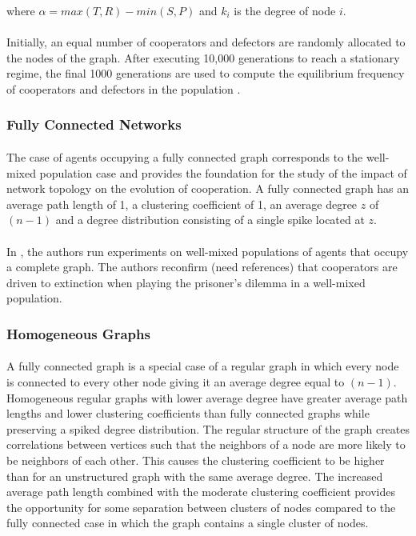 \documentclass{article}
\begin{document}
    where $\alpha=max(T,R)-min(S,P)$ and $k_i$ is the degree of node $i$.

    \paragraph{}Initially, an equal number of cooperators and defectors are randomly allocated to the nodes of the graph.  After executing 10,000 generations to reach a stationary regime, the final 1000 generations are used to compute the equilibrium frequency of cooperators and defectors in the population \cite{Hauert2004}.

    \subsubsection{Fully Connected Networks}
    \paragraph{}The case of agents occupying a fully connected graph corresponds to the well-mixed population case and provides the foundation for the study of the impact of network topology on the evolution of cooperation.  A fully connected graph has an average path length of 1, a clustering coefficient of 1, an average degree $z$ of $(n-1)$ and a degree distribution consisting of a single spike located at $z$.
    \paragraph{} In \cite{Santos2006c}, the authors run experiments on well-mixed populations of agents that occupy a complete graph.  The authors reconfirm (need references) that cooperators are driven to extinction when playing the prisoner’s dilemma in a well-mixed population.
    
    \subsubsection{Homogeneous Graphs}
    \paragraph{}A fully connected graph is a special case of a regular graph in which every node is connected to every other node giving it an average degree equal to $(n-1)$.   Homogeneous regular graphs with lower average degree have greater average path lengths and lower clustering coefficients than fully connected graphs while preserving a spiked degree distribution.  The regular structure of the graph creates correlations between vertices such that the neighbors of a node are more likely to be neighbors of each other.  This causes the clustering coefficient to be higher than for an unstructured graph with the same average degree.  The increased average path length combined with the moderate clustering coefficient provides the opportunity for some separation between clusters of nodes compared to the fully connected case in which the graph contains a single cluster of nodes.
\end{document}
